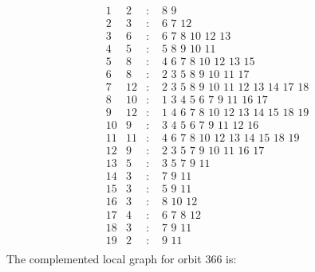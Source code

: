 \documentclass[12pt]{article}
\begin{document}
\begin{equation*}
\begin{array}{rrcl}
1&2&:&\,\,8\,\,9\\
2&3&:&\,\,6\,\,7\,\,12\\
3&6&:&\,\,6\,\,7\,\,8\,\,10\,\,12\,\,13\\
4&5&:&\,\,5\,\,8\,\,9\,\,10\,\,11\\
5&8&:&\,\,4\,\,6\,\,7\,\,8\,\,10\,\,12\,\,13\,\,15\\
6&8&:&\,\,2\,\,3\,\,5\,\,8\,\,9\,\,10\,\,11\,\,17\\
7&12&:&\,\,2\,\,3\,\,5\,\,8\,\,9\,\,10\,\,11\,\,12\,\,13\,\,14\,\,17\,\,18\\
8&10&:&\,\,1\,\,3\,\,4\,\,5\,\,6\,\,7\,\,9\,\,11\,\,16\,\,17\\
9&12&:&\,\,1\,\,4\,\,6\,\,7\,\,8\,\,10\,\,12\,\,13\,\,14\,\,15\,\,18\,\,19\\
10&9&:&\,\,3\,\,4\,\,5\,\,6\,\,7\,\,9\,\,11\,\,12\,\,16\\
11&11&:&\,\,4\,\,6\,\,7\,\,8\,\,10\,\,12\,\,13\,\,14\,\,15\,\,18\,\,19\\
12&9&:&\,\,2\,\,3\,\,5\,\,7\,\,9\,\,10\,\,11\,\,16\,\,17\\
13&5&:&\,\,3\,\,5\,\,7\,\,9\,\,11\\
14&3&:&\,\,7\,\,9\,\,11\\
15&3&:&\,\,5\,\,9\,\,11\\
16&3&:&\,\,8\,\,10\,\,12\\
17&4&:&\,\,6\,\,7\,\,8\,\,12\\
18&3&:&\,\,7\,\,9\,\,11\\
19&2&:&\,\,9\,\,11\\
\end{array}
\end{equation*}
The complemented local graph for orbit $366$ is:
\end{document}
